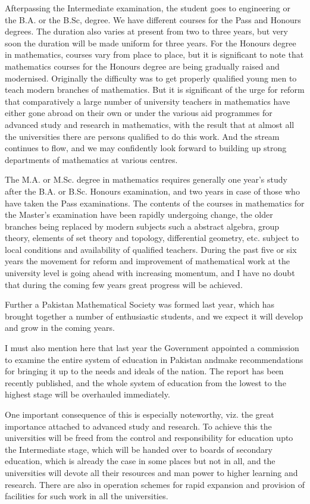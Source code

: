 After\pageoriginale passing the Intermediate examination, the student
goes to engineering or the B.A. or the B.Sc, degree. We have different
courses for the Pass and Honours degrees. The duration also varies at
present from two to three years, but very soon the duration will be
made uniform for three years. For the Honours degree in mathematics,
courses vary from place to place, but it is significant to note that
mathematics courses for the Honours degree are being gradually raised
and modernised. Originally the difficulty was to get properly
qualified young men to teach modern branches of mathematics. But it is
significant of the urge for reform that comparatively a large number
of university teachers in mathematics have either gone abroad on their
own or under the various aid programmes for advanced study and
research in mathematics, with the result that at almost all the
universities there are persons qualified to do this work. And the
stream continues to flow, and we may confidently look forward to
building up strong departments of mathematics at various centres. 

The M.A. or M.Sc. degree in mathematics requires generally one year's study after the B.A. or B.Sc. Honours examination, and two years in case of those who have taken the Pass examinations. The contents of the courses in mathematics for the Master's examination have been rapidly undergoing change, the older branches being replaced by modern subjects such a abstract algebra, group theory, elements of set theory and topology, differential geometry, etc. subject to local conditions and availability of qualified teachers. During the past five or six years the movement for reform and improvement of mathematical work at the university level is going ahead with increasing momentum, and I have no doubt that during the coming few years great progress will be achieved.

Further a Pakistan Mathematical Society was formed last year, which has brought together a number of enthusiastic students, and we expect it will develop and grow in the coming years.

I must also mention here that last year the Government appointed a commission to examine the entire system of education in Pakistan and\pageoriginale make recommendations for bringing it up to the needs and ideals of the nation. The report has been recently published, and the whole system of education from the lowest to the highest stage will be overhauled immediately.

One important consequence of this is especially noteworthy, viz. the great importance attached to advanced study and research. To achieve this the universities will be freed from the control and responsibility for education upto the Intermediate stage, which will be handed over to boards of secondary education, which is already the case in some places but not in all, and the universities will devote all their resources and man power to higher learning and research. There are also in operation schemes for rapid expansion and provision of facilities for such work in all the universities.


